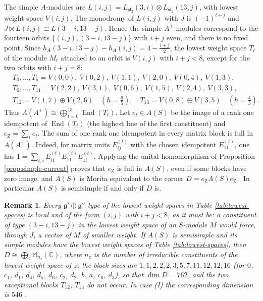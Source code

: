 \documentclass[leqno]{article}
\newcommand{\Cbb}{\ensuremath{\mathbb{C}}}
\newcommand{\Mat}{\ensuremath{\mathbb{M}}}
\newcommand{\ot}{\otimes}
\newtheorem{remark}[thm]{Remark}
\numberwithin{equation}{section}
\begin{document}
The simple $A$-modules are $L(i,j) = L_{\mathfrak{sl}_2}(3,i) \ot L_{\mathfrak{sl}_2}(13,j)$, with lowest weight space $V(i,j)$. The monodromy of $L(i,j)$ with $J$ is $(-1)^{i+j}$ and $J \boxtimes L(i,j) \cong L(3-i,13-j)$. Hence the simple $A^+$-modules correspond \cite{DLM96,HKL15} to the fourteen orbits $\{(i,j),(3-i,13-j)\}$ with $i+j$ even, and there is no fixed point. Since $h_A(3-i,13-j) - h_A(i,j) = 4 - \frac{i+j}{2}$, the lowest weight space $T_t$ of the module $M_t$ attached to an orbit is $V(i,j)$ with $i+j < 8$, except for the two orbits with $i + j = 8$:
\begin{equation}
\label{eq:affine-blocks}
\begin{aligned}
&T_0, \ldots, T_5 = V(0,0),\ V(0,2),\ V(1,1),\ V(2,0),\ V(0,4),\ V(1,3),\\
&T_6, \ldots, T_{11} = V(2,2),\ V(3,1),\ V(0,6),\ V(1,5),\ V(2,4),\ V(3,3),\\
&T_{12} = V(1,7) \oplus V(2,6) \quad (h = \tfrac65), \quad T_{13} = V(0,8) \oplus V(3,5) \quad (h = \tfrac43).
\end{aligned}
\end{equation}
Thus $A(A^+) \cong \bigoplus_{t=0}^{13}\operatorname{End}(T_t)$. Let $e_t \in A(S)$ be the image of a rank one idempotent of $\operatorname{End}(T_t)$ (the highest line of the first constituent) and $e_{\mathrm Z} = \sum_t e_t$. The sum of one rank one idempotent in every matrix block is full in $A(A^+)$. Indeed, for matrix units $E^{(t)}_{ij}$ with the chosen idempotent $E^{(t)}_{11}$, one has $1 = \sum_{t,i}E^{(t)}_{i1}E^{(t)}_{11}E^{(t)}_{1i}$. Applying the unital homomorphism of Proposition \ref{prop:simple-current} proves that $e_{\mathrm Z}$ is full in $A(S)$, even if some blocks have zero image, and $A(S)$ is Morita equivalent to the corner $D = e_{\mathrm Z}A(S)e_{\mathrm Z}$ \cite[Lemma 8.2]{Rie26b}. In particular $A(S)$ is semisimple if and only if $D$ is.

\begin{remark}\normalfont
\label{rem:expected-corner}
Every $\mathfrak g' \oplus \mathfrak g''$-type of the lowest weight spaces in Table \ref{tab:lowest-spaces} is local and of the form $(i,j)$ with $i+j < 8$, as it must be: a constituent of type $(3-i,13-j)$ in the lowest weight space of an $S$-module $M$ would force, through $J$, a vector of $M$ of smaller weight. If $A(S)$ is semisimple and its simple modules have the lowest weight spaces of Table \ref{tab:lowest-spaces}, then $D \cong \bigoplus_{z} \Mat_{n_z}(\Cbb)$, where $n_z$ is the number of irreducible constituents of the lowest weight space of $z$: the block sizes are $1, 1, 2, 2, 2, 3, 5, 7, 11, 12, 12, 16$ (for $0$, $c_1$, $d_1$, $d_4$, $d_5$, $d_6$, $c_2$, $d_2$, $b$, $a$, $c_0$, $d_3$), so that $\dim D = 762$, and the two exceptional blocks $T_{12}$, $T_{13}$ do not occur. In case (I) the corresponding dimension is $546$ \cite[Proposition 9.5]{Rie26b}.
\end{remark}
\end{document}
